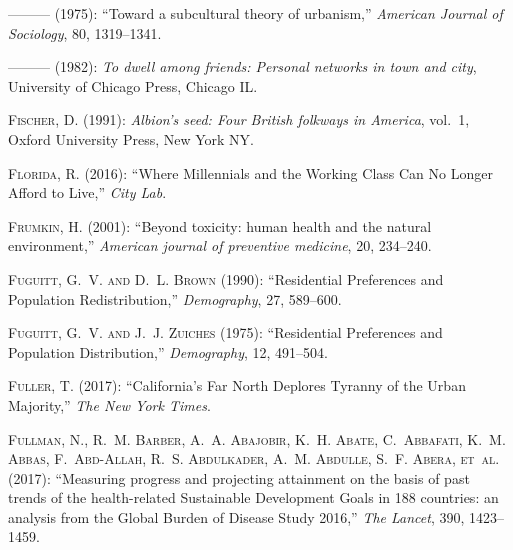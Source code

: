 \documentclass[10pt, letterpaper]{article}
\begin{document}
\begin{spacing}{2.0}
\begin{thebibliography}{115}
---\hspace{-.1pt}---\hspace{-.1pt}--- (1975): \enquote{Toward a subcultural
  theory of urbanism,} \emph{American Journal of Sociology}, 80, 1319--1341.

---\hspace{-.1pt}---\hspace{-.1pt}--- (1982): \emph{To dwell among friends:
  Personal networks in town and city}, University of Chicago Press, Chicago IL.

\textsc{Fischer, D.} (1991): \emph{Albion's seed: Four British folkways in
  America}, vol.~1, Oxford University Press, New York NY.

\textsc{Florida, R.} (2016): \enquote{Where Millennials and the Working Class
  Can No Longer Afford to Live,} \emph{City Lab}.

\textsc{Frumkin, H.} (2001): \enquote{Beyond toxicity: human health and the
  natural environment,} \emph{American journal of preventive medicine}, 20,
  234--240.

\textsc{Fuguitt, G.~V. and D.~L. Brown} (1990): \enquote{Residential
  Preferences and Population Redistribution,} \emph{Demography}, 27, 589--600.

\textsc{Fuguitt, G.~V. and J.~J. Zuiches} (1975): \enquote{Residential
  Preferences and Population Distribution,} \emph{Demography}, 12, 491--504.

\textsc{Fuller, T.} (2017): \enquote{California's Far North Deplores Tyranny of
  the Urban Majority,} \emph{The New York Times}.

\textsc{Fullman, N., R.~M. Barber, A.~A. Abajobir, K.~H. Abate, C.~Abbafati,
  K.~M. Abbas, F.~Abd-Allah, R.~S. Abdulkader, A.~M. Abdulle, S.~F. Abera,
  et~al.} (2017): \enquote{Measuring progress and projecting attainment on the
  basis of past trends of the health-related Sustainable Development Goals in
  188 countries: an analysis from the Global Burden of Disease Study 2016,}
  \emph{The Lancet}, 390, 1423--1459.


\end{thebibliography}
\end{spacing}
\end{document}
